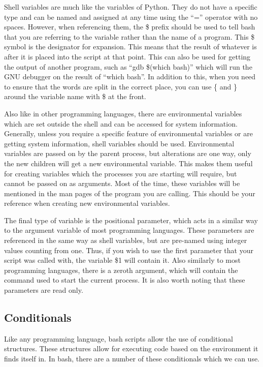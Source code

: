 			Shell variables are much like the variables of Python.
			They do not have a specific type and can be named and assigned at any time using the ``='' operator with no spaces.
			However, when referencing them, the \$ prefix should be used to tell bash that you are referring to the variable rather than the name of a program.
			This \$ symbol is the designator for expansion.
			This means that the result of whatever is after it is placed into the script at that point.
			This can also be used for getting the output of another program, such as ``gdb \$(which bash)'' which will run the GNU debugger on the result of ``which bash''.
			In addition to this, when you need to ensure that the words are split in the correct place, you can use \{ and \} around the variable name with \$ at the front.

			Also like in other programming languages, there are environmental variables which are set outside the shell and can be accessed for system information.
			Generally, unless you require a specific feature of environmental variables or are getting system information, shell variables should be used.
			Environmental variables are passed on by the parent process, but alterations are one way, only the new children will get a new environmental variable.
			This makes them useful for creating variables which the processes you are starting will require, but cannot be passed on as arguments.
			Most of the time, these variables will be mentioned in the man pages of the program you are calling.
			This should be your reference when creating new environmental variables.

			The final type of variable is the positional parameter, which acts in a similar way to the argument variable of most programming languages.
			These parameters are referenced in the same way as shell variables, but are pre-named using integer values counting from one.
			Thus, if you wish to use the first parameter that your script was called with, the variable \$1 will contain it.
			Also similarly to most programming languages, there is a zeroth argument, which will contain the command used to start the current process.
			It is also worth noting that these parameters are read only.


		\subsection{Conditionals}
			Like any programming language, bash scripts allow the use of conditional structures.
			These structures allow for executing code based on the environment it finds itself in.
			In bash, there are a number of these conditionals which we can use.

